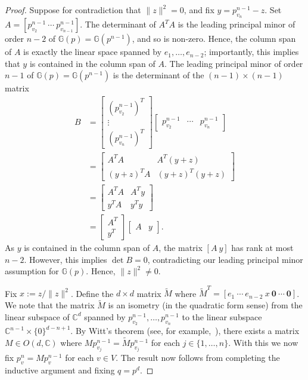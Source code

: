 \documentclass[ALCO]{cedram}
\begin{document}
\begin{proof}
	Suppose for contradiction that $\|z\|^2 = 0$,
	and fix $y = p^{n-1}_{v_{n}} - z$.
	Set $A = [p^{n-1}_{v_2} ~ \cdots ~ p^{n-1}_{v_{n-1}}]$.
	The determinant of $A^T A$ is the leading principal minor of order $n-2$ of $\mathbb{G}(p) = \mathbb{G}(p^{n-1})$,
	and so is non-zero.
	Hence, the column span of $A$ is exactly the linear space spanned by $e_1,\ldots, e_{n-2}$;
	importantly,
	this implies that $y$ is contained in the column span of $A$.
	The leading principal minor of order $n-1$ of $\mathbb{G}(p) = \mathbb{G}(p^{n-1})$ is the determinant of the $(n-1) \times (n-1)$ matrix
	\begin{align*}
		B &=		
		\begin{bmatrix}
			(p^{n-1}_{v_2})^T \\
			\vdots \\
			(p^{n-1}_{v_{n}})^T
		\end{bmatrix}
		\begin{bmatrix}
			p^{n-1}_{v_2} & \cdots & p^{n-1}_{v_{n}}
		\end{bmatrix}\\
		&=
		\begin{bmatrix}
			A^T A & A^T (y+z) \\
			(y+z)^T A & (y+z)^T (y+z)
		\end{bmatrix}\\
		&=
		\begin{bmatrix}
			A^T A & A^T y \\
			y^T A & y^T y
		\end{bmatrix}\\
		&= 
		\begin{bmatrix}
			A^T \\
			y^T
		\end{bmatrix}
		\begin{bmatrix}
			A & y
		\end{bmatrix}.
	\end{align*}
	As $y$ is contained in the column span of $A$,
	the matrix $[A ~ y]$ has rank at most $n-2$.
	However, this implies $\det B = 0$,
	contradicting our leading principal minor assumption for $\mathbb{G}(p)$.
	Hence, $\|z\|^2 \neq 0$.
	
	Fix $x := z/\|z\|^2$.
	Define the $d \times d$ matrix $\tilde{M}$ where $\tilde{M}^T = [ e_1 ~ \cdots ~ e_{n-2} ~ x ~ \mathbf{0} ~ \cdots ~ \mathbf{0}]$.
	We note that the matrix $\tilde{M}$ is an isometry (in the quadratic form sense) from the linear subspace of $\mathbb{C}^d$ spanned by $p^{n-1}_{v_2},\ldots, p^{n-1}_{v_{n}}$ to the linear subspace $\mathbb{C}^{n-1} \times \{0\}^{d-n+1}$.
	By Witt's theorem (see, for example,~\cite[Theorem 11.15]{roman}),
	there exists a matrix $M \in O(d, \mathbb{C})$ where $Mp^{n-1}_{v_j} = \tilde{M}p^{n-1}_{v_j}$ for each $j \in \{1,\ldots,n\}$.
	With this we now fix $p^n_v = Mp^{n-1}_v$ for each $v \in V$.
	The result now follows from completing the inductive argument and fixing $q = p^d$.
\end{proof}
\end{document}
